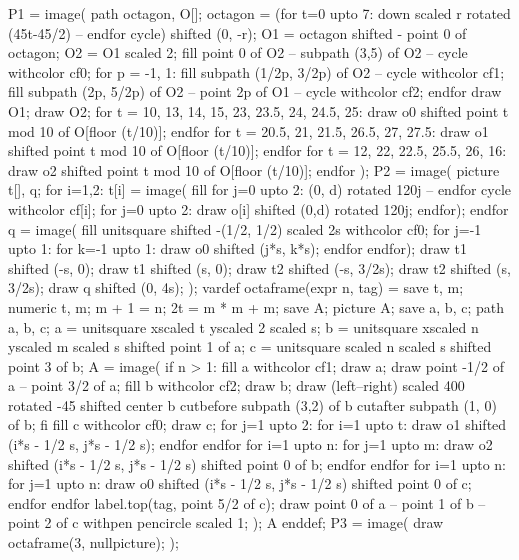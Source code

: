 \documentclass[oneside]{scrbook}
\begin{document}
   P1 = image(
       path octagon, O[];
       octagon = (for t=0 upto 7: down scaled r rotated (45t-45/2) -- endfor cycle) shifted (0, -r);
       O1 = octagon shifted - point 0 of octagon;
       O2 = O1 scaled 2; 
       fill point 0 of O2 -- subpath (3,5) of O2 -- cycle withcolor cf0;
       for p = -1, 1:
           fill subpath (1/2p, 3/2p) of O2 -- cycle withcolor cf1;
           fill subpath (2p, 5/2p) of O2 -- point 2p of O1 -- cycle withcolor cf2;
       endfor
       draw O1; draw O2;
       for t = 10, 13, 14, 15, 23, 23.5, 24, 24.5, 25:
           draw o0 shifted point t mod 10 of O[floor (t/10)];
       endfor
       for t = 20.5, 21, 21.5, 26.5, 27, 27.5:
           draw o1 shifted point t mod 10 of O[floor (t/10)];
       endfor
       for t = 12, 22, 22.5, 25.5, 26, 16:
           draw o2 shifted point t mod 10 of O[floor (t/10)];
       endfor
   );
   P2 = image(
       picture t[], q;
       for i=1,2:
           t[i] = image(
               fill for j=0 upto 2: (0, d) rotated 120j -- endfor cycle withcolor cf[i];
               for j=0 upto 2: draw o[i] shifted (0,d) rotated 120j; endfor);
       endfor
       q = image(
           fill unitsquare shifted -(1/2, 1/2) scaled 2s withcolor cf0;
           for j=-1 upto 1: for k=-1 upto 1: draw o0 shifted (j*s, k*s); endfor endfor);
       draw t1 shifted (-s, 0); draw t1 shifted (s, 0); 
       draw t2 shifted (-s, 3/2s); draw t2 shifted (s, 3/2s);
       draw q shifted (0, 4s);
   );
   vardef octaframe(expr n, tag) = 
       save t, m; numeric t, m;
       m + 1 = n; 2t = m * m + m;
       save A; picture A; 
       save a, b, c; path a, b, c;
       a = unitsquare xscaled t yscaled 2 scaled s;
       b = unitsquare xscaled n yscaled m scaled s shifted point 1 of a;
       c = unitsquare scaled n scaled s shifted point 3 of b; 
       A = image(
           if n > 1:
               fill a withcolor cf1; draw a; draw point -1/2 of a -- point 3/2 of a;
               fill b withcolor cf2; draw b; 
               draw (left--right) scaled 400 rotated -45 shifted center b 
                   cutbefore subpath (3,2) of b cutafter subpath (1, 0) of b;
           fi
           fill c withcolor cf0; draw c;
           for j=1 upto 2:
               for i=1 upto t:
                   draw o1 shifted (i*s - 1/2 s, j*s - 1/2 s);
               endfor
           endfor
           for i=1 upto n:
               for j=1 upto m:
                   draw o2 shifted (i*s - 1/2 s, j*s - 1/2 s) shifted point 0 of b;
               endfor
           endfor
           for i=1 upto n:
               for j=1 upto n:
                   draw o0 shifted (i*s - 1/2 s, j*s - 1/2 s) shifted point 0 of c;
               endfor
           endfor
           label.top(tag, point 5/2 of c);
           draw point 0 of a -- point 1 of b -- point 2 of c withpen pencircle scaled 1;
       ); A enddef;
   P3 = image(
       draw octaframe(3, nullpicture);
   );
\end{document}
